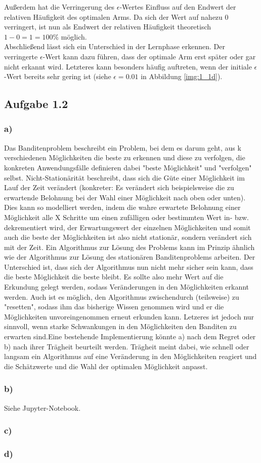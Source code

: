 \documentclass[11pt]{article}
\begin{document}
Außerdem hat die Verringerung des $\epsilon$-Wertes Einfluss auf den Endwert der relativen Häufigkeit des optimalen Arms. Da sich der Wert auf nahezu $0$ verringert, ist nun als Endwert der relativen Häufigkeit theoretisch $1-0=1=100\%$ möglich.\\
Abschließend lässt sich ein Unterschied in der Lernphase erkennen. Der verringerte $\epsilon$-Wert kann dazu führen, dass der optimale Arm erst später oder gar nicht erkannt wird. Letzteres kann besonders häufig auftreten, wenn der initiale $\epsilon$-Wert bereits sehr gering ist (siehe $\epsilon=0.01$ in Abbildung \ref{img:1_1d}).

\subsection*{Aufgabe 1.2}
\subsubsection*{a)}
Das Banditenproblem beschreibt ein Problem, bei dem es darum geht, aus k verschiedenen Möglichkeiten die beste zu erkennen und diese zu verfolgen, die konkreten Anwendungsfälle definieren dabei "beste Möglichkeit" und "verfolgen" selbst. Nicht-Stationärität beschreibt, dass sich die Güte einer Möglichkeit im Lauf der Zeit verändert (konkreter: Es verändert sich beispielsweise die zu erwartende Belohnung bei der Wahl einer Möglichkeit nach oben oder unten). Dies kann so modelliert werden, indem die wahre erwartete Belohnung einer Möglichkeit alle X Schritte um einen zufälligen oder bestimmten Wert in- bzw. dekrementiert wird, der Erwartungswert der einzelnen Möglichkeiten und somit auch die beste der Möglichkeiten ist also nicht stationär, sondern verändert sich mit der Zeit. Ein Algorithmus zur Lösung des Problems kann im Prinzip ähnlich wie der Algorithmus zur Lösung des stationären Banditenproblems arbeiten. Der Unterschied ist, dass sich der Algorithmus nun nicht mehr sicher sein kann, dass die beste Möglichkeit die beste bleibt. Es sollte also mehr Wert auf die Erkundung gelegt werden, sodass Veränderungen in den Möglichkeiten erkannt werden. Auch ist es möglich, den Algorithmus zwischendurch (teilsweise) zu "resetten", sodass ihm das bisherige Wissen genommen wird und er die Möglichkeiten unvoreingenommen erneut erkunden kann. Letzeres ist jedoch nur sinnvoll, wenn starke Schwankungen in den Möglichkeiten den Banditen zu erwarten sind.Eine bestehende Implementierung könnte a) nach dem Regret oder b) nach ihrer Trägheit beurteilt werden. Trägheit meint dabei, wie schnell oder langsam ein Algorithmus auf eine Veränderung in den Möglichkeiten reagiert und die Schätzwerte und die Wahl der optimalen Möglichkeit anpasst.

\subsubsection*{b)}

Siehe Jupyter-Notebook.

\subsubsection*{c)}


\subsubsection*{d)}

\end{document}
